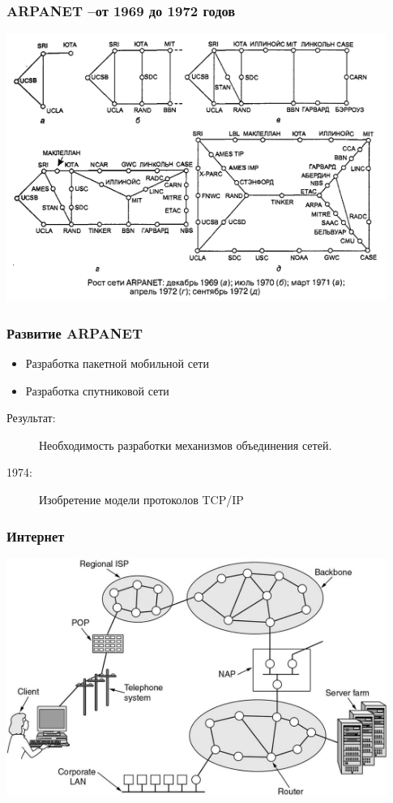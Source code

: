 \documentclass[utf8]{beamer}
\begin{document}
\begin{frame}
\frametitle{ARPANET --от 1969 до 1972 годов}
\includegraphics[width=0.93\textwidth]{pic/arpanet-development.png}
\newline
\end{frame}
\begin{frame}
\frametitle{Развитие ARPANET}
\begin{itemize}
	\item Разработка пакетной мобильной сети
	\item Разработка спутниковой сети
\end{itemize}
\begin{description}
\item[Результат:] Необходимость разработки механизмов объединения сетей.
\item[1974:] Изобретение модели протоколов TCP/IP
\end{description}
\end{frame}
\begin{frame}
\frametitle{Интернет}
\includegraphics[width=0.93\textwidth]{pic/internet-overview.jpg}
\end{frame}
\end{document}
